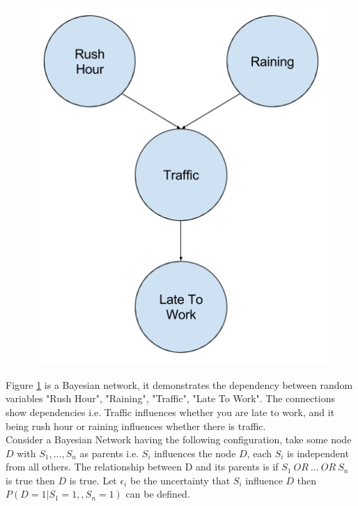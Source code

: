\begin{figure}[H]
	\centering
	\begin{minipage}[b]{0.4\textwidth}
		\includegraphics[width=\textwidth]{bayesian-network-example.png}
		\caption{}
		\label{fig:bayesian-network-example}
	\end{minipage}
	\hfill
\end{figure}

Figure \ref{fig:bayesian-network-example} is a Bayesian network, it demonstrates the dependency between random variables "Rush Hour", "Raining", "Traffic", "Late To Work". The connections show dependencies i.e. Traffic influences whether you are late to work, and it being rush hour or raining influences whether there is traffic.\\

Consider a Bayesian Network having the following configuration, take some node $D$ with $S_1,..., S_n$ as parents i.e. $S_i$ influences the node $D$, each $S_i$ is independent from all others. The relationship between D and its parents is if $S_1\ OR\ ...\ OR\ S_n$ is true then $D$ is true. Let $\epsilon_i$ be the uncertainty that $S_i$ influence $D$ then $P(D = 1| S_1 = 1, , S_n = 1)$ can be defined.

